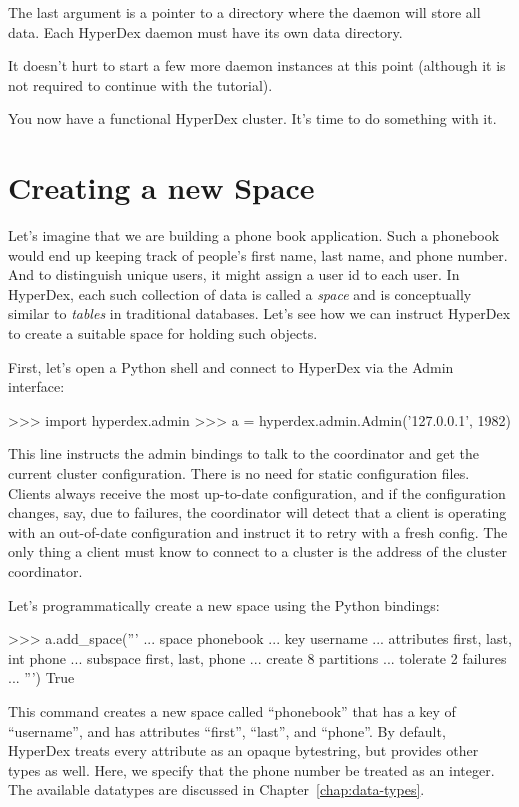The last argument is a pointer to a directory where the daemon will store all
data.  Each HyperDex daemon must have its own data directory.

It doesn't hurt to start a few more daemon instances at this point (although it
is not required to continue with the tutorial).

You now have a functional HyperDex cluster.  It's time to do something with it.

\section{Creating a new Space}

Let's imagine that we are building a phone book application.  Such a phonebook
would end up keeping track of people's first name, last name, and phone number.
And to distinguish unique users, it might assign a user id to each user.  In
HyperDex, each such collection of data is called a {\em space} and is
conceptually similar to {\em tables} in traditional databases.  Let's see how we
can instruct HyperDex to create a suitable space for holding such objects.

First, let's open a Python shell and connect to HyperDex via the Admin interface:

\begin{pythoncode}
>>> import hyperdex.admin
>>> a = hyperdex.admin.Admin('127.0.0.1', 1982)
\end{pythoncode}

This line instructs the admin bindings to talk to the coordinator and get the
current cluster configuration.  There is no need for static configuration files.
Clients always receive the most up-to-date configuration, and if the
configuration changes, say, due to failures, the coordinator will detect that a
client is operating with an out-of-date configuration and instruct it to retry
with a fresh config.  The only thing a client must know to connect to a cluster
is the address of the cluster coordinator.

Let's programmatically create a new space using the Python bindings:

\begin{pythoncode}
>>> a.add_space('''
... space phonebook
... key username
... attributes first, last, int phone
... subspace first, last, phone
... create 8 partitions
... tolerate 2 failures
... ''')
True
\end{pythoncode}

This command creates a new space called ``phonebook'' that has a key of
``username'', and has attributes ``first'', ``last'', and ``phone''.  By
default, HyperDex treats every attribute as an opaque bytestring, but provides
other types as well.  Here, we specify that the phone number be treated as an
integer.  The available datatypes are discussed in
Chapter~\ref{chap:data-types}.

